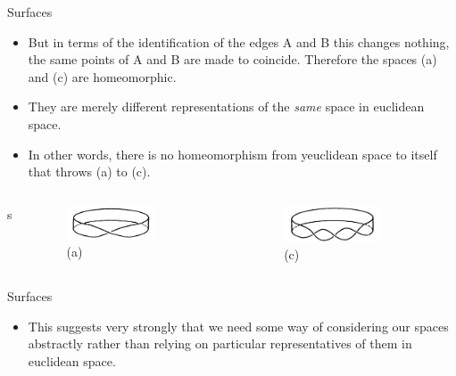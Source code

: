 \documentclass{beamer}
\begin{document}
\begin{frame}{Surfaces}
  \begin{block}{}
    \begin{itemize}
    \item But in terms of the identification of the edges A and B this changes nothing, the same points of A and B are made to coincide. Therefore the spaces (a) and (c) are homeomorphic.
    \item They are merely different representations of the \textsl{same} space in euclidean space.
    \item In other words, there is no homeomorphism from yeuclidean space to itself that throws (a) to (c).
    \end{itemize}
  \end{block}
  \begin{columns}
s    \begin{column}{0.5\textwidth}
      \begin{figure}
        \centering
        \includegraphics[width=0.7\textwidth]{figure_1_14_a.png}
        \caption{(a)}
      \end{figure}
    \end{column}
    \begin{column}{0.5\textwidth}
      \begin{figure}
        \centering
        \includegraphics[width=0.7\textwidth]{figure_1_14_c.png}
        \caption{(c)}
      \end{figure}
    \end{column}
  \end{columns}
\end{frame}

\begin{frame}{Surfaces}
  \begin{block}{}
    \begin{itemize}
    \item This suggests very strongly that we need some way of considering our spaces abstractly rather than relying on particular representatives of them in euclidean space.
    \end{itemize}
  \end{block}
\end{frame}
\end{document}
